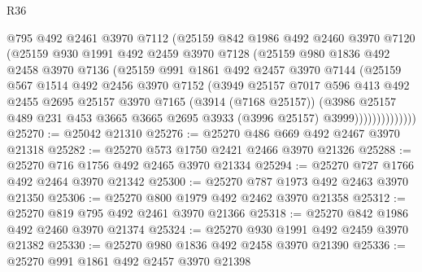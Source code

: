 \begin{lexlean}{R36}
\begin{coremodule}
                  @795
                  @492
                  @2461
                  @3970
                  @7112
                  (@25159
                    @842
                    @1986
                    @492
                    @2460
                    @3970
                    @7120
                    (@25159
                      @930
                      @1991
                      @492
                      @2459
                      @3970
                      @7128
                      (@25159
                        @980
                        @1836
                        @492
                        @2458
                        @3970
                        @7136
                        (@25159
                          @991
                          @1861
                          @492
                          @2457
                          @3970
                          @7144
                          (@25159
                            @567
                            @1514
                            @492
                            @2456
                            @3970
                            @7152
                            (@3949
                              @25157
                              @7017
                              @596
                              @413
                              @492
                              @2455
                              @2695
                              @25157
                              @3970
                              @7165
                              (@3914 (@7168 @25157))
                              (@3986
                                @25157
                                @489
                                @231
                                @453
                                @3665
                                @3665
                                @2695
                                @3933
                                (@3996 @25157)
                                @3999))))))))))))))
@25270 := @25042 @21310
@25276 := @25270 @486 @669 @492 @2467 @3970 @21318
@25282 := @25270 @573 @1750 @2421 @2466 @3970 @21326
@25288 := @25270 @716 @1756 @492 @2465 @3970 @21334
@25294 := @25270 @727 @1766 @492 @2464 @3970 @21342
@25300 := @25270 @787 @1973 @492 @2463 @3970 @21350
@25306 := @25270 @800 @1979 @492 @2462 @3970 @21358
@25312 := @25270 @819 @795 @492 @2461 @3970 @21366
@25318 := @25270 @842 @1986 @492 @2460 @3970 @21374
@25324 := @25270 @930 @1991 @492 @2459 @3970 @21382
@25330 := @25270 @980 @1836 @492 @2458 @3970 @21390
@25336 := @25270 @991 @1861 @492 @2457 @3970 @21398

\end{coremodule}
\end{lexlean}
